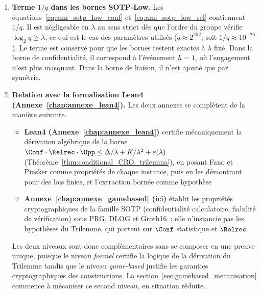 \begin{sloppypar}
\begin{enumerate}
\item \textbf{Terme $1/q$ dans les bornes SOTP-Low.}
      Les \'equations~\eqref{eq:ann_sotp_low_conf}
      et~\eqref{eq:ann_sotp_low_rel} contiennent $1/q$. Il est n\'egligeable en $\lambda$ au
      sens strict d\`es que l'ordre du groupe v\'erifie $\log_2 q \geq \lambda$, ce
      qui est le cas des param\`etres utilis\'es ($q \approx 2^{252}$, soit
      $1/q \approx 10^{-76}$). Le terme est conserv\'e pour que les bornes restent
      exactes \`a $\lambda$ fix\'e. Dans la borne de confidentialit\'e, il correspond \`a
      l'\'ev\'enement $h = 1$, o\`u l'engagement n'est plus masquant. Dans la borne de liaison,
      il n'est ajout\'e que par sym\'etrie.

\item \textbf{Relation avec la formalisation Lean4 (Annexe~\ref{chap:annexe_lean4}).}
      Les deux annexes se compl\`etent de la mani\`ere suivante.
      \begin{itemize}
      \item \textbf{Lean4 (Annexe~\ref{chap:annexe_lean4})} certifie m\'ecaniquement la
            d\'erivation alg\'ebrique de la borne
            $\Conf\cdot\Relrec\cdot\Opp \leq \Delta/\lambda + K/\lambda^2 + \varepsilon(\lambda)$
            (Th\'eor\`eme~\ref{thm:conditional_CRO_trilemma}), en posant Fano et
            Pinsker comme propri\'et\'es de chaque instance, puis en les d\'emontrant
            pour des lois finies, et l'extraction born\'ee comme hypoth\`ese
      \item \textbf{Annexe~\ref{chap:annexe_gamebased} (ici)} \'etablit les
            propri\'et\'es cryptographiques de la famille SOTP (confidentialit\'e
            calculatoire, fiabilit\'e de v\'erification) sous PRG, DLOG et Groth16~;
            elle n'instancie pas les hypoth\`eses du Trilemme, qui portent sur
            $\Conf$ statistique et $\Relrec$
      \end{itemize}
      Les deux niveaux sont donc compl\'ementaires sans se composer en une preuve
      unique, puisque le niveau \emph{formel} certifie la logique de la d\'erivation du
      Trilemme tandis que le niveau \emph{game-based} justifie les garanties
      cryptographiques des constructions. La
      section~\ref{sec:gamebased_mecanisation} commence \`a m\'ecaniser ce second niveau,
      en situation r\'eduite.

\end{enumerate}
\end{sloppypar}